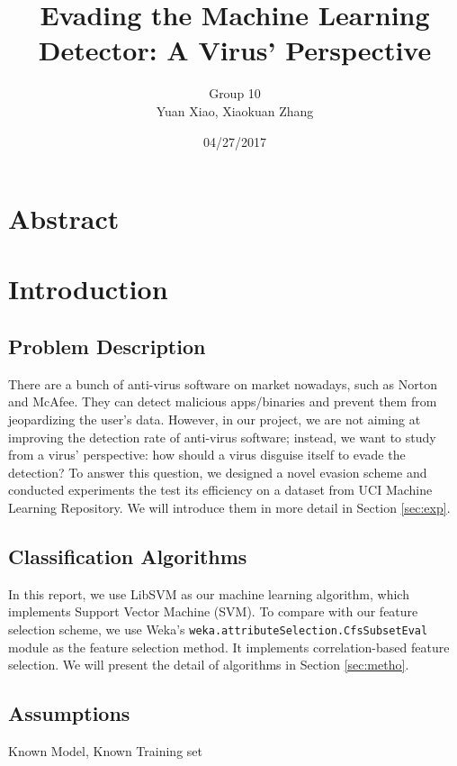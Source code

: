\documentclass[11pt]{article}
\title{Evading the Machine Learning Detector: A Virus’ Perspective}
\author{Group 10 \\ Yuan Xiao, Xiaokuan Zhang}
\date{04/27/2017}
\begin{document}
\maketitle
\section*{Abstract}


\section{Introduction}

\subsection{Problem Description}
There are a bunch of anti-virus software on market nowadays, such as Norton and McAfee. They can detect malicious apps/binaries and prevent them from jeopardizing the user's data. However, in our project, we are not aiming at improving the detection rate of anti-virus software; instead, we want to study from a virus' perspective: how should a virus disguise itself to evade the detection? To answer this question, we designed a novel evasion scheme and conducted experiments the test its efficiency on a dataset from UCI Machine Learning Repository. We will introduce them in more detail in Section \ref{sec:exp}.

\subsection{Classification Algorithms}
In this report, we use LibSVM \cite{CC01a} as our machine learning  algorithm, which implements Support Vector Machine (SVM). To compare with our feature selection scheme, we use Weka's \texttt{weka.attributeSelection.CfsSubsetEval} module as the feature selection method. It implements correlation-based feature selection. We will present the detail of algorithms in Section \ref{sec:metho}.

\subsection{Assumptions} \label{sec:assumption}
Known Model, Known Training set
\end{document}
